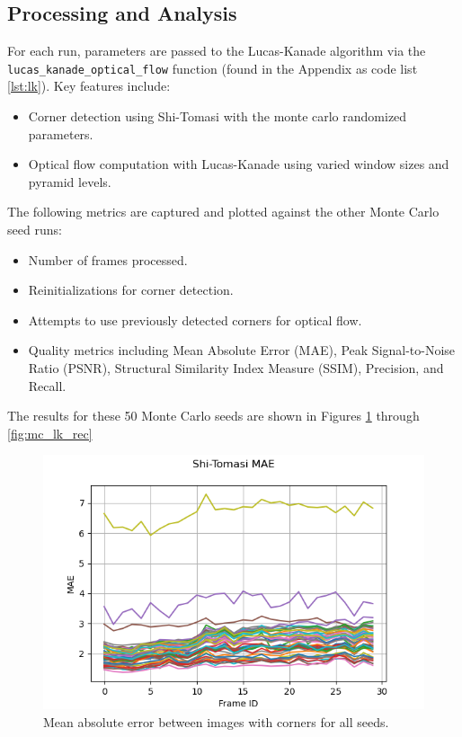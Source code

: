 \documentclass[11pt, conference, letterpaper]{IEEEtran}
\begin{document}
\subsection{Processing and Analysis}

For each run, parameters are passed to the Lucas-Kanade algorithm via the \texttt{lucas\_kanade\_optical\_flow} function (found in the Appendix as code list \ref{lst:lk}). Key features include:
\begin{itemize}
    \item Corner detection using Shi-Tomasi with the monte carlo randomized parameters.
    \item Optical flow computation with Lucas-Kanade using varied window sizes and pyramid levels.
\end{itemize}

The following metrics are captured and plotted against the other Monte Carlo seed runs:
\begin{itemize}
    \item Number of frames processed.
    \item Reinitializations for corner detection.
    \item Attempts to use previously detected corners for optical flow.
    \item Quality metrics including Mean Absolute Error (MAE), Peak Signal-to-Noise Ratio (PSNR), Structural Similarity Index Measure (SSIM), Precision, and Recall.
\end{itemize}

The results for these 50 Monte Carlo seeds are shown in Figures \ref{fig:mc_stc_mae} through \ref{fig:mc_lk_rec}

\begin{figure}[h!]
    \centering
    \includegraphics[width=\linewidth]{mc_images/mc_stc_mae.png}
    \caption{Mean absolute error between images with corners for all seeds.}
    \label{fig:mc_stc_mae}
\end{figure}
\end{document}
